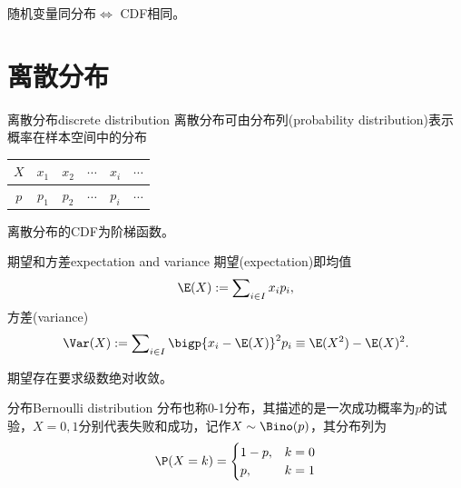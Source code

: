 \begin{corollary}
	随机变量同分布$\iff$ CDF相同。
\end{corollary}

\section{离散分布}

\begin{definition}{离散分布}{discrete distribution}
	离散分布可由分布列(probability distribution)表示概率在样本空间中的分布
	\begin{center}
		\begin{tabular}{cccccc}
			\toprule
			$X$&$x_1$&$x_2$&$\cdots$&$x_i$&$\cdots$\\
			\midrule
			$p$&$p_1$&$p_2$&$\cdots$&$p_i$&$\cdots$\\
			\bottomrule
		\end{tabular}
	\end{center}
\end{definition}

\begin{corollary}
	离散分布的CDF为阶梯函数。

\end{corollary}

\begin{definition}{期望和方差}{expectation and variance}
	期望(expectation)即均值
	\begin{equation}
		\E(X):=\sum\nolimits_{i\in I}x_ip_i,
	\end{equation}
	方差(variance)
	\begin{equation}
		\Var(X):=\sum\nolimits_{i\in I}\bigp{x_i-\E(X)}^2p_i\equiv\E(X^2)-\E(X)^2.
	\end{equation}
\end{definition}

\begin{remark}
	期望存在要求级数绝对收敛。
\end{remark}

\begin{definition}{\Bern 分布}{Bernoulli distribution}
	\Bern 分布也称0-1分布，其描述的是一次成功概率为$p$的\Bern 试验，$X=0,1$分别代表失败和成功，记作$X\sim\Bino(p)$，其分布列为
	\begin{equation}
		\P(X=k)=\begin{cases}
			1-p,&k=0\\
			p,&k=1
		\end{cases}
	\end{equation}
\end{definition}


